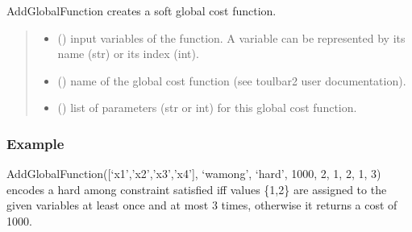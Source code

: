 \documentclass[letterpaper,10pt,openany,oneside,english]{sphinxmanual}
\begin{document}
\begin{fulllineitems}
\begin{fulllineitems}
\end{fulllineitems}


\begin{fulllineitems}
\label{\detokenize{ref/ref_python:pytoulbar2.CFN.AddGlobalFunction}}
\pysigstartsignatures
{}
\pysigstopsignatures
\sphinxAtStartPar
AddGlobalFunction creates a soft global cost function.
\begin{quote}\begin{description}
\begin{itemize}
\item {} 
\sphinxAtStartPar
{} () \textendash{} input variables of the function. A variable can be represented by its name (str) or its index (int).

\item {} 
\sphinxAtStartPar
{} () \textendash{} name of the global cost function (see toulbar2 user documentation).

\item {} 
\sphinxAtStartPar
{} () \textendash{} list of parameters (str or int) for this global cost function.

\end{itemize}

\end{description}\end{quote}
\subsubsection*{Example}

\sphinxAtStartPar
AddGlobalFunction({[}‘x1’,’x2’,’x3’,’x4’{]}, ‘wamong’, ‘hard’, 1000, 2, 1, 2, 1, 3) encodes a hard among constraint satisfied iff values \{1,2\} are assigned to the given variables at least once and at most 3 times, otherwise it returns a cost of 1000.

\end{fulllineitems}


\end{fulllineitems}
\end{document}

